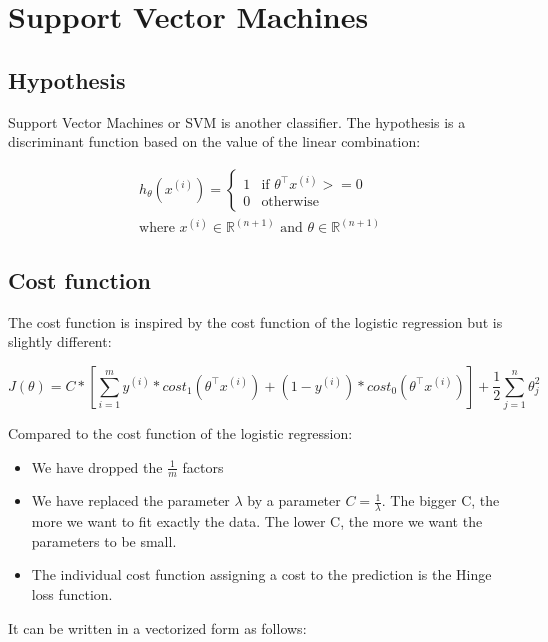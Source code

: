 \documentclass[a4paper, 12pt]{article}
\begin{document}
\section{Support Vector Machines}

\subsection{Hypothesis}

Support Vector Machines or SVM is another classifier.  The hypothesis is a discriminant function based on the value of the linear combination:

\begin{align*}
& h_{\theta}(x^{(i)}) = 
\begin{cases}
1 & \text{if } \theta^{\top}x^{(i)} >= 0 \\
0 & \text{otherwise} 
\end{cases}
& \\
& \text{where } x^{(i)} \in \mathbb{R}^{(n+1)} \text{ and } \theta \in \mathbb{R}^{(n+1)}
\end{align*}

\subsection{Cost function}

The cost function is inspired by the cost function of the logistic regression but is slightly different:

\begin{equation}
J(\theta) = C * \left[ \sum_{i=1}^{m} y^{(i)} * cost_1(\theta^{\top}x^{(i)}) + (1-y^{(i)})*cost_0(\theta^{\top}x^{(i)}) \right] + \frac{1}{2} \sum_{j=1}^{n} \theta_{j}^{2}
\end{equation}

Compared to the cost function of the logistic regression:

\begin{itemize}
\item We have dropped the $\frac{1}{m}$ factors
\item We have replaced the parameter $\lambda$ by a parameter $C = \frac{1}{\lambda}$. The bigger C, the more we want to fit exactly the data. The lower C, the more we want the parameters to be small.
\item The individual cost function assigning a cost to the prediction is the Hinge loss function.
\end{itemize}

It can be written in a vectorized form as follows:
\end{document}
